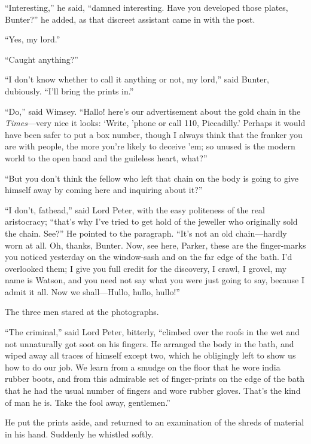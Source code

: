 \enquote{Interesting,} he said, \enquote{damned interesting. Have you developed those plates, Bunter?} he added, as that discreet assistant came in with the post.

\enquote{Yes, my lord.}

\enquote{Caught anything?}

\enquote{I don’t know whether to call it anything or not, my lord,} said Bunter, dubiously. \enquote{I’ll bring the prints in.}

\enquote{Do,} said Wimsey. \enquote{Hallo! here’s our advertisement about the gold chain in the \textit{Times}---very nice it looks: \enquote{Write, ’phone or call 110, Piccadilly.} Perhaps it would have been safer to put a box number, though I always think that the franker you are with people, the more you’re likely to deceive ’em; so unused is the modern world to the open hand and the guileless heart, what?}

\enquote{But you don’t think the fellow who left that chain on the body is going to give himself away by coming here and inquiring about it?}

\enquote{I don’t, fathead,} said Lord Peter, with the easy politeness of the real aristocracy; \enquote{that’s why I’ve tried to get hold of the jeweller who originally sold the chain. See?} He pointed to the paragraph. \enquote{It’s not an old chain\allowbreak---\allowbreak hardly worn at all. Oh, thanks, Bunter. Now, see here, Parker, these are the finger-marks you noticed yesterday on the window-sash and on the far edge of the bath. I’d overlooked them; I give you full credit for the discovery, I crawl, I grovel, my name is Watson, and you need not say what you were just going to say, because I admit it all. Now we shall\allowbreak---\allowbreak Hullo, hullo, hullo!}

The three men stared at the photographs.

\enquote{The criminal,} said Lord Peter, bitterly, \enquote{climbed over the roofs in the wet and not unnaturally got soot on his fingers. He arranged the body in the bath, and wiped away all traces of himself except two, which he obligingly left to show us how to do our job. We learn from a smudge on the floor that he wore india rubber boots, and from this admirable set of finger-prints on the edge of the bath that he had the usual number of fingers and wore rubber gloves. That’s the kind of man he is. Take the fool away, gentlemen.}

He put the prints aside, and returned to an examination of the shreds of material in his hand. Suddenly he whistled softly.

